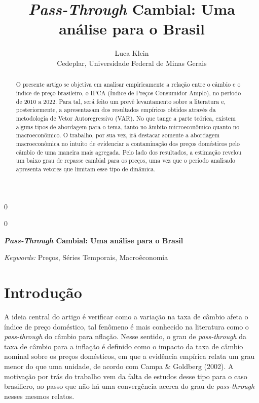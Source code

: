 \documentclass[12pt]{article}
\newcommand{\blind}{0}
\begin{document}
\def\spacingset#1{\renewcommand{\baselinestretch}%
{#1}\small\normalsize} \spacingset{1}



\blind
{
  \title{\bf \emph{Pass-Through} Cambial: Uma análise para o Brasil}

  \author{
        Luca Klein \\
    Cedeplar, Universidade Federal de Minas Gerais\\
      }
  \maketitle
} \fi

\blind
{
  \bigskip
  \bigskip
  \bigskip
  \begin{center}
    {\LARGE\bf \emph{Pass-Through} Cambial: Uma análise para o Brasil}
  \end{center}
  \medskip
} \fi

\bigskip
\begin{abstract}
O presente artigo se objetiva em analisar empiricamente a relação entre
o câmbio e o índice de preço brasileiro, o IPCA (Índice de Preços
Consumidor Amplo), no período de 2010 a 2022. Para tal, será feito um
prevê levantamento sobre a literatura e, posteriormente, a apresentasam
dos resultados empíricos obtidos através da metodologia de Vetor
Autoregressivo (VAR). No que tange a parte teórica, existem alguns tipos
de abordagem para o tema, tanto no âmbito microeconômico quanto no
macroeconômico. O trabalho, por sua vez, irá destacar somente a
abordagem macroeconômica no intuito de evidenciar a contaminação dos
preços domésticos pelo câmbio de uma maneira mais agregada. Pelo lado
dos resultados, a estimação revelou um baixo grau de repasse cambial
para os preços, uma vez que o período analisado apresenta vetores que
limitam esse tipo de dinâmica.
\end{abstract}

\noindent%
{\it Keywords:} Preços, Séries Temporais, Macroêconomia
\vfill

\newpage
\spacingset{1.45} %

\hypertarget{introduuxe7uxe3o}{%
\section{Introdução}\label{introduuxe7uxe3o}}

A ideia central do artigo é verificar como a variação na taxa de câmbio
afeta o índice de preço doméstico, tal fenômeno é mais conhecido na
literatura como o \emph{pass-through} do câmbio para nflação. Nesse
sentido, o grau de \emph{pass-through} da taxa de câmbio para a inflação
é definido como o impacto da taxa de câmbio nominal sobre os preços
domésticos, em que a evidência empírica relata um grau menor do que uma
unidade, de acordo com Campa \& Goldberg (2002). A motivação por trás do
trabalho vem da falta de estudos desse tipo para o caso brasiliero, ao
passo que não há uma convergência acerca do grau de \emph{pass-through}
nesses mesmos relatos.
\end{document}
